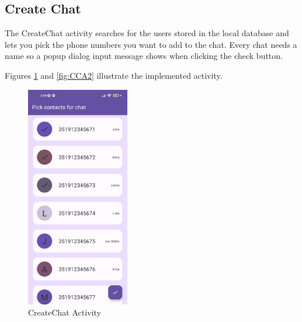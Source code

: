 \newpage

\newpage

\subsection{Create Chat}
The CreateChat activity searches for the users stored in the local database and lets you pick the phone numbers you want to add to the chat. Every chat needs a name so a popup dialog input message shows when clicking the check button.

Figures \ref{fig:CCA1} and \ref{fig:CCA2} illustrate the implemented activity.


\begin{figure}[!ht]
	\centering
	\includegraphics[trim={0cm -3cm 0 -3cm}, width=0.4\textwidth]{./Chapter6/Figures/Picked Users}
	\caption{CreateChat Activity}
	\label{fig:CCA1}
\end{figure}

\newpage

